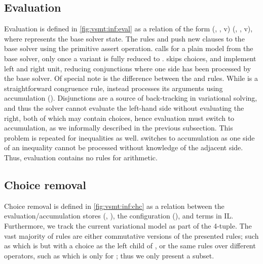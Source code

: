 \subsection{Evaluation}
%
Evaluation is defined in \autoref{fig:vsmt:inf:eval} as a relation of the form
(\aStore{}, \eStore{}, v) \evaluation{} (\aStore{}, \eStore{}, v), where
\eStore{} represents the base solver state. The rules  and
 push new clauses to the base solver using the primitive assert
operation.  calls for a plain model from the base solver,
only once a variant is fully reduced to \unit{}.  skips
choices,  and  implement left and right unit,
reducing conjunctions where one side has been processed by the base solver. Of
special note is the difference between the  and
 rules. While  is a straightforward congruence
rule,  instead processes its arguments using accumulation
(\accumulation{}). Disjunctions are a source of back-tracking in variational
solving, and thus the solver cannot evaluate the left-hand side without
evaluating the right, both of which may contain choices, hence evaluation must
switch to accumulation, as we informally described in the previous subsection.
This problem is repeated for inequalities as well.  switches
to accumulation as one side of an inequality cannot be processed without
knowledge of the adjacent side. Thus, evaluation contains no rules for
arithmetic.

\subsection{Choice removal}
Choice removal is defined in \autoref{fig:vsmt:inf:chc} as a relation between
the evaluation/accumulation stores (\aStore{}, \eStore{}), the configuration
(\configuration{}), and terms in IL\@. Furthermore, we track the current
variational model as part of the 4-tuple. The vast majority of rules are either
commutative versions of the presented rules; such as  which is
 but with a choice as the left child of \boolFuncs{}, or the same
rules over different operators, such as  which is 
only for \inequalities{}; thus we only present a subset.

